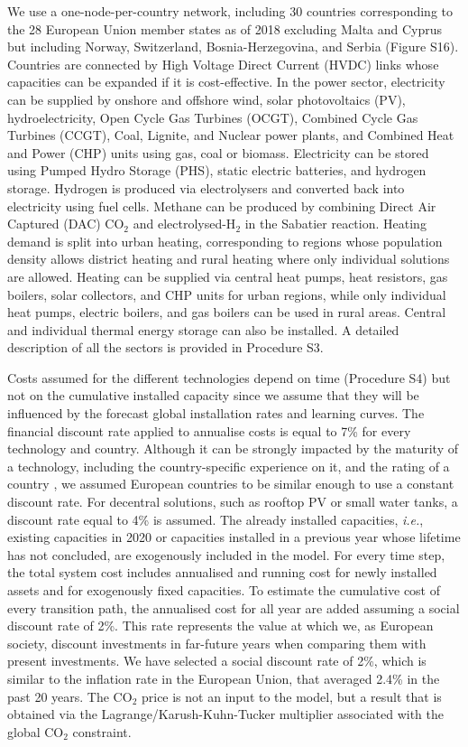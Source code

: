 \documentclass[5p]{elsarticle} %
\begin{document}
We use a one-node-per-country network, including 30 countries corresponding to the 28 European Union member states as of 2018 excluding Malta and Cyprus but including Norway, Switzerland, Bosnia-Herzegovina, and Serbia (Figure S16). Countries are connected by High Voltage Direct Current (HVDC) links whose capacities can be expanded if it is cost-effective. In the power sector, electricity can be supplied by onshore and offshore wind, solar photovoltaics (PV), hydroelectricity, Open Cycle Gas Turbines (OCGT), Combined Cycle Gas Turbines (CCGT), Coal, Lignite, and Nuclear power plants, and Combined Heat and Power (CHP) units using gas, coal or biomass. Electricity can be stored using Pumped Hydro Storage (PHS), static electric batteries, and hydrogen storage. Hydrogen is produced via electrolysers and converted back into electricity using fuel cells. Methane can be produced by combining Direct Air Captured (DAC) CO$_2$ and electrolysed-H$_2$ in the Sabatier reaction. Heating demand is split into urban heating, corresponding to regions whose population density allows district heating and rural heating where only individual solutions are allowed. Heating can be supplied via central heat pumps, heat resistors, gas boilers, solar collectors, and CHP units for urban regions, while only individual heat pumps, electric boilers, and gas boilers can be used in rural areas. Central and individual thermal energy storage can also be installed. A detailed description of all the sectors is provided in Procedure S3. \

Costs assumed for the different technologies depend on time (Procedure S4) but not on the cumulative installed capacity since we assume that they will be influenced by the forecast global installation rates and learning curves. The financial discount rate applied to annualise costs is equal to 7\% for every technology and country. Although it can be strongly impacted by the maturity of a technology, including the country-specific experience on it, and the rating of a country \cite{Egli_2019}, we assumed European countries to be similar enough to use a constant discount rate. For decentral solutions, such as rooftop PV or small water tanks, a discount rate equal to 4\% is assumed. The already installed capacities, \textit{i.e.}, existing capacities in 2020 or capacities installed in a previous year whose lifetime has not concluded, are exogenously included in the model. For every time step, the total system cost includes annualised and running cost for newly installed assets and for exogenously fixed capacities. To estimate the cumulative cost of every transition path, the annualised cost for all year are added assuming a social discount rate of 2\%. This rate represents the value at which we, as European society, discount investments in far-future years when comparing them with present investments. We have selected a social discount rate of 2\%, which is similar to the inflation rate in the European Union, that averaged 2.4\% in the past 20 years. The CO$_2$ price is not an input to the model, but a result that is obtained via the Lagrange/Karush-Kuhn-Tucker multiplier associated with the global CO$_2$ constraint. 
\end{document}
